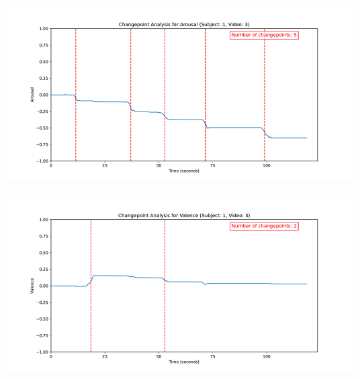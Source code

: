 \documentclass[11pt, letterpaper]{article}
\begin{document}
\begin{figure}
        \centering
    \begin{subfigure}[t]{0.49\textwidth}
        \centering
        \includegraphics[width=\linewidth]{sub_1_changepoints_V3_arousal} 
        \caption{} \label{fig:sub_1_changepoints_V3_arousal}
    \end{subfigure}
    \hfill
    \begin{subfigure}[t]{0.49\textwidth}
        \centering
        \includegraphics[width=\linewidth]{sub_1_changepoints_V3_valence} 
        \caption{} \label{fig:sub_1_changepoints_V3_valence}
    \end{subfigure}

    \vspace{1cm}
    

\end{figure}
\end{document}
